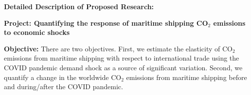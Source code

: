 \documentclass[hidelinks, 12pt,letterpaper]{article}
\begin{document}


    

\begin{center}
\textbf{Detailed Description of Proposed Research: }\vspace{-0.25cm}
\end{center}

\noindent \textbf{Project: Quantifying the response of maritime shipping CO$_2$ emissions to economic shocks} 
\smallskip 

\noindent \textbf{Objective:} There are two objectives. First, we estimate the elasticity of CO$_2$ emissions from maritime shipping with respect to international trade using the COVID pandemic demand shock as a source of significant variation. Second, we quantify a change in the worldwide CO$_2$ emissions from maritime shipping before and during/after the COVID pandemic.
\smallskip 
\end{document}
